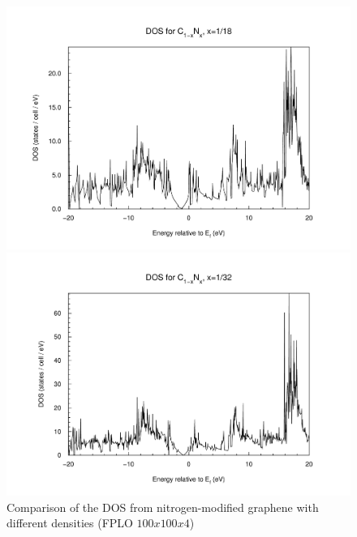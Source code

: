 \begin{figure}
\begin{minipage}[t]{0.3\textwidth}
					\end{minipage}
					\begin{minipage}[t]{0.3\textwidth}
						\includegraphics[width=\textwidth]{Results/Nitrogen/Nitrogen3/nitrogen3dos.pdf}
					\end{minipage}
					\begin{minipage}[t]{0.3\textwidth}
						\includegraphics[width=\textwidth]{Results/Nitrogen/Nitrogen4/nitrogen4dos.pdf}
					\end{minipage}															
					\caption{Comparison of the DOS from nitrogen-modified graphene with different densities (FPLO $100x100x4$)}
					\label{fig:NitrogenDOSComparisson}
				\end{figure}
